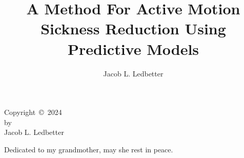 \documentclass{wit-thesis}
\author{Jacob L. Ledbetter}
\title{A Method For Active Motion Sickness Reduction Using Predictive Models}
\begin{document}
\maketitle

\makesignature

\begin{copyrightpage}
  Copyright~\copyright~2024 \\
  by \\
  Jacob L. Ledbetter
\end{copyrightpage}


% 
\begin{dedication}
  \vspace{3in}
  \centering
  Dedicated to my grandmother, may she rest in peace.
\end{dedication}


% 


\begin{abstract}
  
\end{abstract}


\tableofcontents
\end{document}
